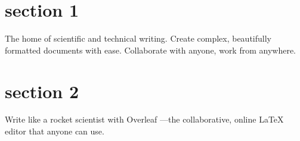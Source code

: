 \documentclass{article}
\begin{document}
\section{section 1}
The home of scientific and technical writing. Create complex, beautifully
formatted documents with ease.
Collaborate with anyone, work from anywhere.
\section{section 2}
Write like a rocket scientist with Overleaf —the collaborative, online LaTeX editor
that anyone can use.
\end{document}
